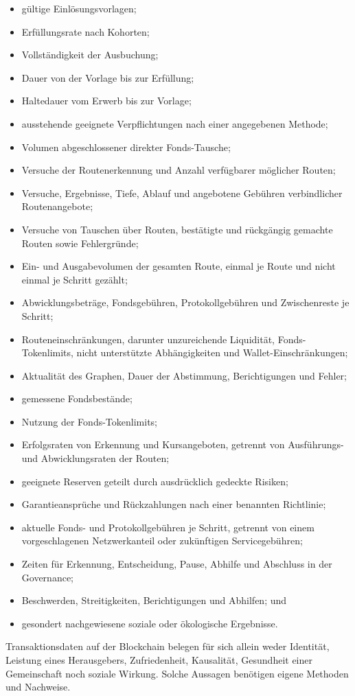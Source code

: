 \documentclass[11pt]{article}
\begin{document}
\begin{itemize}[leftmargin=*]
\item gültige Einlösungsvorlagen;
\item Erfüllungsrate nach Kohorten;
\item Vollständigkeit der Ausbuchung;
\item Dauer von der Vorlage bis zur Erfüllung;
\item Haltedauer vom Erwerb bis zur Vorlage;
\item ausstehende geeignete Verpflichtungen nach einer angegebenen Methode;
\item Volumen abgeschlossener direkter Fonds-Tausche;
\item Versuche der Routenerkennung und Anzahl verfügbarer möglicher Routen;
\item Versuche, Ergebnisse, Tiefe, Ablauf und angebotene Gebühren verbindlicher Routenangebote;
\item Versuche von Tauschen über Routen, bestätigte und rückgängig gemachte Routen sowie Fehlergründe;
\item Ein- und Ausgabevolumen der gesamten Route, einmal je Route und nicht einmal je Schritt gezählt;
\item Abwicklungsbeträge, Fondsgebühren, Protokollgebühren und Zwischenreste je Schritt;
\item Routeneinschränkungen, darunter unzureichende Liquidität, Fonds-Tokenlimits, nicht unterstützte Abhängigkeiten und Wallet-Einschränkungen;
\item Aktualität des Graphen, Dauer der Abstimmung, Berichtigungen und Fehler;
\item gemessene Fondsbestände;
\item Nutzung der Fonds-Tokenlimits;
\item Erfolgsraten von Erkennung und Kursangeboten, getrennt von Ausführungs- und Abwicklungsraten der Routen;
\item geeignete Reserven geteilt durch ausdrücklich gedeckte Risiken;
\item Garantieansprüche und Rückzahlungen nach einer benannten Richtlinie;
\item aktuelle Fonds- und Protokollgebühren je Schritt, getrennt von einem vorgeschlagenen Netzwerkanteil oder zukünftigen Servicegebühren;
\item Zeiten für Erkennung, Entscheidung, Pause, Abhilfe und Abschluss in der Governance;
\item Beschwerden, Streitigkeiten, Berichtigungen und Abhilfen; und
\item gesondert nachgewiesene soziale oder ökologische Ergebnisse.
\end{itemize}
Transaktionsdaten auf der Blockchain belegen für sich allein weder Identität, Leistung eines Herausgebers, Zufriedenheit, Kausalität, Gesundheit einer Gemeinschaft noch soziale Wirkung. Solche Aussagen benötigen eigene Methoden und Nachweise.
\end{document}

